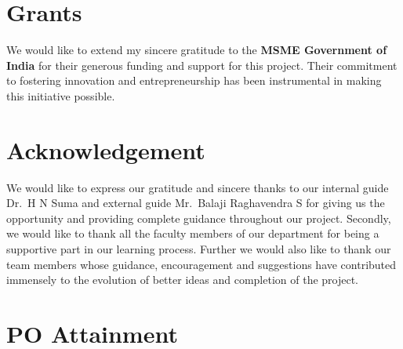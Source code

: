 \documentclass{article}
\begin{document}
\section{Grants}\label{grants}

We would like to extend my sincere gratitude to the \textbf{MSME
Government of India} for their generous funding and support for this
project. Their commitment to fostering innovation and entrepreneurship
has been instrumental in making this initiative possible.

\section{Acknowledgement}\label{acknowledgement}

We would like to express our gratitude and sincere thanks to our
internal guide Dr.~H N Suma and external guide Mr.~Balaji Raghavendra S
for giving us the opportunity and providing complete guidance throughout
our project. Secondly, we would like to thank all the faculty members of
our department for being a supportive part in our learning process.
Further we would also like to thank our team members whose guidance,
encouragement and suggestions have contributed immensely to the
evolution of better ideas and completion of the project.

\newpage

\section{PO Attainment}\label{po-attainment}
\end{document}
